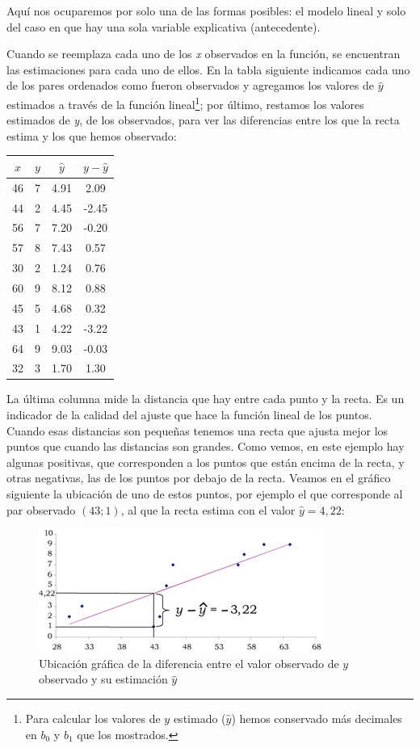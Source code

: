 \documentclass[]{book}
\let\rmarkdownfootnote\footnote%
\def\footnote{\protect\rmarkdownfootnote}
\begin{document}
Aquí nos ocuparemos por solo una de las formas posibles: el modelo lineal y solo del caso en que hay una sola variable explicativa (antecedente).

Cuando se reemplaza cada uno de los \emph{x} observados en la función, se
encuentran las estimaciones para cada uno de ellos. En la tabla
siguiente indicamos cada uno de los pares ordenados como fueron
observados y agregamos los valores de \(\widehat{y}\) estimados a través
de la función lineal\footnote{Para calcular los valores de \(y\) estimado (\(\widehat{y}\)) hemos conservado más decimales en \(b_0\) y \(b_1\) que los mostrados.}; por último, restamos los valores estimados de
\emph{y}, de los observados, para ver las diferencias entre los que la recta
estima y los que hemos observado:

\begin{longtable}[]{@{}cccc@{}}
\toprule
\(x\) & \(y\) & \(\widehat{y}\) & \(y - \widehat{y}\)\tabularnewline
\midrule
\endhead
46 & 7 & 4.91 & 2.09\tabularnewline
44 & 2 & 4.45 & -2.45\tabularnewline
56 & 7 & 7.20 & -0.20\tabularnewline
57 & 8 & 7.43 & 0.57\tabularnewline
30 & 2 & 1.24 & 0.76\tabularnewline
60 & 9 & 8.12 & 0.88\tabularnewline
45 & 5 & 4.68 & 0.32\tabularnewline
43 & 1 & 4.22 & -3.22\tabularnewline
64 & 9 & 9.03 & -0.03\tabularnewline
32 & 3 & 1.70 & 1.30\tabularnewline
\bottomrule
\end{longtable}

La última columna mide la distancia que hay entre cada punto y la recta.
Es un indicador de la calidad del ajuste que hace la función lineal de
los puntos. Cuando esas distancias son pequeñas tenemos una recta que
ajusta mejor los puntos que cuando las distancias son grandes. Como
vemos, en este ejemplo hay algunas positivas, que corresponden a los
puntos que están encima de la recta, y otras negativas, las de los
puntos por debajo de la recta. Veamos en el gráfico siguiente la
ubicación de uno de estos puntos, por ejemplo el que corresponde al par
observado \((43; 1)\), al que la recta estima con el valor \(\widehat{y} = 4,22\):

\begin{figure}

{\centering \includegraphics{imagenes/grafico13} 

}

\caption{Ubicación gráfica de la diferencia entre el valor observado de $y$ observado y su estimación $\widehat{y}$}\label{fig:unnamed-chunk-162}
\end{figure}
\end{document}
